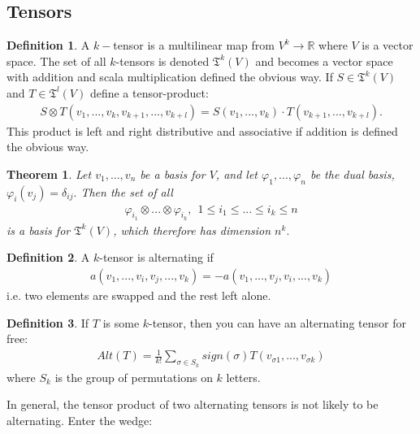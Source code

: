 \documentclass[20pt]{article}
\theoremstyle{plain}
\newtheorem{theorem}{Theorem}
\theoremstyle{definition}
\newtheorem{definition}{Definition}
\newcommand{\reals}{\mathbb{R}}
\begin{document}
\subsection{Tensors}
\begin{definition}
  A $k-$tensor is a multilinear map from 
  $V^k \to \reals$ where $V$ is a vector space.
  The set of all $k$-tensors is denoted $\mathfrak{T}^k(V)$ and becomes a vector space 
  with addition and scala multiplication defined the obvious way.
  If $S \in \mathfrak{T}^k(V)$ and $T \in \mathfrak{T}^l(V)$
  define a tensor-product:
  \begin{align*}
    S \otimes T (v_1, ..., v_k, v_{k+1}, ..., v_{k+l}) = 
    S(v_1, ..., v_k)\cdot T(v_{k+1}, ..., v_{k+l}).
  \end{align*}
  This product is left and right distributive and associative if addition is defined the obvious way.
\end{definition}

\begin{theorem}
  Let $v_1, ..., v_n$ be a basis for $V$, and let 
  $\varphi_1, ..., \varphi_n$ be the dual basis, $\varphi_i(v_j) = \delta_{ij}.$
  Then the set of all 
  \begin{align*}
    \varphi_{i_1} \otimes ... \otimes \varphi_{i_k}, \ \ 1 \leq i_1 \leq ... \leq i_k \leq n
  \end{align*}
  is a basis for $\mathfrak{T}^k(V)$, which therefore has dimension $n^k.$
\end{theorem}


\begin{definition}
  A $k$-tensor is alternating if
  \begin{align*}
    a(v_1, ..., v_i, v_j, ..., v_k) = -a(v_1, ..., v_j, v_i, ..., v_k)
  \end{align*}
  i.e. two elements are swapped and the rest left alone.
\end{definition}


\begin{definition}
  If $T$ is some $k$-tensor, 
  then you can have an alternating tensor for free:
  \begin{align*}
    Alt(T) = \frac{1}{k!}\sum_{\sigma \in S_k} sign(\sigma)
      T(v_{\sigma1}, ..., v_{\sigma k})
  \end{align*}
  where $S_k$ is the group of permutations on $k$ letters.
\end{definition}

In general, the tensor product of two alternating tensors is not likely to be alternating.  Enter the wedge:
\end{document}
